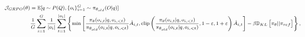 \begin{itemize}[topsep=0pt]
\begin{itemize}
\begin{equation}
\footnotesize
\begin{split}
    \mathcal{J}_{GRPO}(\theta) &= \mathbb{E}{[q \sim P(Q), \{o_i\}_{i=1}^G \sim \pi_{\theta_{old}}(O|q)]}  \\
    & \frac{1}{G}\sum_{i=1}^G\frac{1}{|o_i|} \sum_{t=1}^{|o_i|} \left\{ \min \left[ \frac{\pi_\theta(o_{i,t} | q, o_{i,<t})}{\pi_{\theta_{old}}(o_{i,t} | q, o_{i,<t})} \hat{A}_{i,t}, \text{clip} \left( \frac{\pi_\theta(o_{i,t} | q, o_{i,<t})}{\pi_{\theta_{old}}(o_{i,t} | q, o_{i,<t})}, 1 - \varepsilon, 1 + \varepsilon \right)  \hat{A}_{i,t} \right] - \beta \mathbb{D}_{KL}\left[\pi_{\theta} || \pi_{ref}\right]\right\} ,
\end{split}
\label{eq:GRPO-obj}
\end{equation}


\end{itemize}
\end{itemize}
